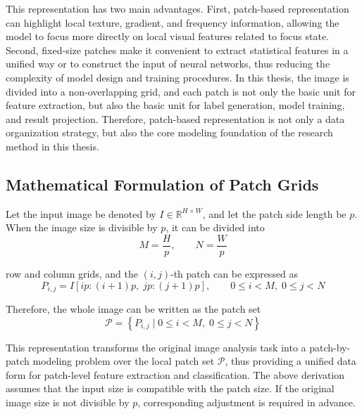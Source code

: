 \par This representation has two main advantages. First, patch-based
representation can highlight local texture, gradient, and frequency
information, allowing the model to focus more directly on local visual features
related to focus state. Second, fixed-size patches make it convenient to
extract statistical features in a unified way or to construct the input of
neural networks, thus reducing the complexity of model design and training
procedures. In this thesis, the image is divided into a non-overlapping grid,
and each patch is not only the basic unit for feature extraction, but also the
basic unit for label generation, model training, and result projection.
Therefore, patch-based representation is not only a data organization strategy,
but also the core modeling foundation of the research method in this thesis.

\subsection{Mathematical Formulation of Patch Grids}
\par Let the input image be denoted by $I\in\mathbb{R}^{H\times W}$, and let
the patch side length be $p$. When the image size is divisible by $p$, it can
be divided into
\begin{equation}
    M=\frac{H}{p},\qquad N=\frac{W}{p}
    \label{eq:patch-grid}
\end{equation}
\par row and column grids, and the $(i,j)$-th patch can be expressed as
\begin{equation}
    P_{i,j}=I[ip:(i+1)p,\; jp:(j+1)p],\qquad
    0\le i<M,\; 0\le j<N
    \label{eq:patch-definition}
\end{equation}
\par Therefore, the whole image can be written as the patch set
\begin{equation}
    \mathcal{P}=\left\{P_{i,j}\mid 0\le i<M,\;0\le j<N\right\}
    \label{eq:patch-set}
\end{equation}
\par This representation transforms the original image analysis task into a
patch-by-patch modeling problem over the local patch set $\mathcal{P}$, thus
providing a unified data form for patch-level feature extraction and
classification. The above derivation assumes that the input size is compatible
with the patch size. If the original image size is not divisible by $p$,
corresponding adjustment is required in advance.

